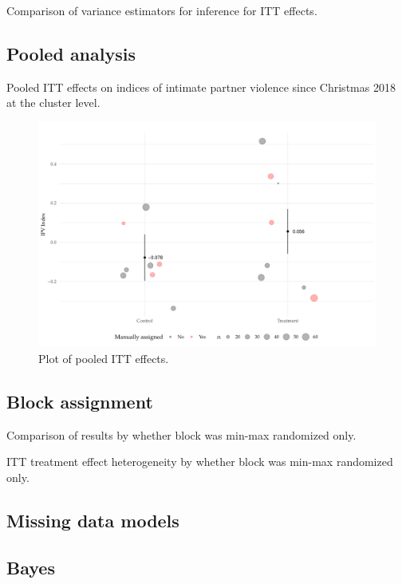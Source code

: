 \documentclass[11pt,english]{article}
\begin{document}
\begin{table}[H]
\centering

\caption{Comparison of variance estimators for inference for ITT effects.}
\label{tab:inference}
\end{table}

\subsection{Pooled analysis}

\begin{table}[H]
\centering

\caption{Pooled ITT effects on indices of intimate partner violence since Christmas 2018 at the cluster level.}
\label{tab:ipv_pooled}
\end{table}

\begin{figure}[H]
\centering
\includegraphics[width = \textwidth]{figures/ipv_pooled.pdf}
\caption{Plot of pooled ITT effects.}
\label{fig:ipv_pooled}
\end{figure}

\subsection{Block assignment}

\begin{table}[H]
\centering

\caption{Comparison of results by whether block was min-max randomized only.}
\label{tab:block_rand}
\end{table}

\begin{table}[H]
\centering

\caption{ITT treatment effect heterogeneity by whether block was min-max randomized only.}
\label{tab:block_rand_X}
\end{table}


\subsection{Missing data models}

\subsection{Bayes}


\end{document}
